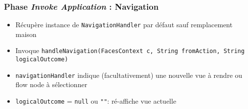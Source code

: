 \documentclass[english, french]{beamer}
\begin{document}
\begin{frame}[label=ph-ian]
	\frametitle{Phase \emph{Invoke Application} : Navigation}
	\begin{itemize}
		\item Récupère instance de \texttt{NavigationHandler} par défaut {\tiny sauf remplacement maison}
		\item Invoque \texttt{handleNavigation(FacesContext c, String fromAction, String logicalOutcome)}
		\item \texttt{navigationHandler} indique (facultativement) une nouvelle vue à rendre {\tiny ou flow node à sélectionner}
		\item \texttt{logicalOutcome} = \texttt{null} ou \texttt{""}: ré-affiche vue actuelle
	\end{itemize}
\end{frame}
\end{document}
